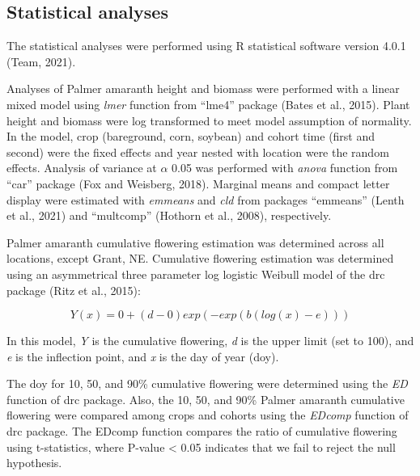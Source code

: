 \documentclass[utf8]{frontiersSCNS}
\begin{document}
\hypertarget{statistical-analyses}{%
\subsection*{Statistical analyses}\label{statistical-analyses}}

The statistical analyses were performed using R statistical software
version 4.0.1 (Team, 2021).

Analyses of Palmer amaranth height and biomass were performed with a
linear mixed model using \emph{lmer} function from ``lme4'' package
(Bates et al., 2015). Plant height and biomass were log transformed to
meet model assumption of normality. In the model, crop (bareground,
corn, soybean) and cohort time (first and second) were the fixed effects
and year nested with location were the random effects. Analysis of
variance at \(\alpha\) 0.05 was performed with \emph{anova} function
from ``car'' package (Fox and Weisberg, 2018). Marginal means and
compact letter display were estimated with \emph{emmeans} and \emph{cld}
from packages ``emmeans'' (Lenth et al., 2021) and ``multcomp'' (Hothorn
et al., 2008), respectively.

Palmer amaranth cumulative flowering estimation was determined across
all locations, except Grant, NE. Cumulative flowering estimation was
determined using an asymmetrical three parameter log logistic Weibull
model of the drc package (Ritz et al., 2015):

\[Y(x) = 0 + (d-0) exp (-exp(b(log(x)-e)))\]

In this model, \emph{Y} is the cumulative flowering, \emph{d} is the
upper limit (set to 100), and \emph{e} is the inflection point, and
\emph{x} is the day of year (doy).

The doy for 10, 50, and 90\% cumulative flowering were determined using
the \emph{ED} function of drc package. Also, the 10, 50, and 90\% Palmer
amaranth cumulative flowering were compared among crops and cohorts
using the \emph{EDcomp} function of drc package. The EDcomp function
compares the ratio of cumulative flowering using t-statistics, where
P-value \textless{} 0.05 indicates that we fail to reject the null
hypothesis.
\end{document}
